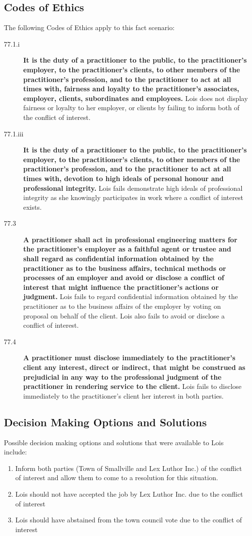 \documentclass[12pt,letterpaper]{article}
\begin{document}
\subsection*{Codes of Ethics}
The following Codes of Ethics apply to this fact scenario:
\begin{description}
	\item[77.1.i] \textbf{It is the duty of a practitioner to the public, to the practitioner's employer, to the practitioner's clients, to other members of the practitioner's profession, and to the practitioner to act at all times with, fairness and loyalty to the practitioner's associates, employer, clients, subordinates and employees.} Lois does not display fairness or loyalty to her employer, or clients by failing to inform both of the conflict of interest.
	\item[77.1.iii] \textbf{It is the duty of a practitioner to the public, to the practitioner's employer, to the practitioner's clients, to other members of the practitioner's profession, and to the practitioner to act at all times with, devotion to high ideals of personal honour and professional integrity.} Lois fails demonstrate high ideals of professional integrity as she knowingly participates in work where a conflict of interest exists.
	\item[77.3] \textbf{A practitioner shall act in professional engineering matters for the practitioner's employer as a faithful agent or trustee and shall regard as confidential information obtained by the practitioner as to the business affairs, technical methods or processes of an employer and avoid or disclose a conflict of interest that might influence the practitioner's actions or judgment.} Lois fails to regard confidential information obtained by the practitioner as to the business affairs of the employer by voting on proposal on behalf of the client. Lois also fails to avoid or disclose a conflict of interest.
	\item[77.4] \textbf{A practitioner must disclose immediately to the practitioner's client any interest, direct or indirect, that might be construed as prejudicial in any way to the professional judgment of the practitioner in rendering service to the client.} Lois fails to disclose immediately to the practitioner's client her interest in both parties.
\end{description}

\subsection*{Decision Making Options and Solutions}
Possible decision making options and solutions that were available to Lois include:
\begin{enumerate}
	\item Inform both parties (Town of Smallville and Lex Luthor Inc.) of the conflict of interest and allow them to come to a resolution for this situation.
	\item Lois should not have accepted the job by Lex Luthor Inc. due to the conflict of interest
	\item Lois should have abstained from the town council vote due to the conflict of interest 
\end{enumerate}
\clearpage
\end{document}
